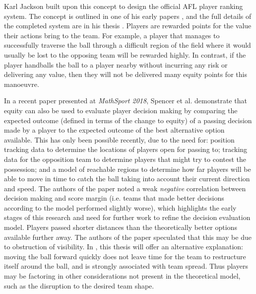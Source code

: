 Karl Jackson built upon this concept to design the official AFL player ranking system. The concept is outlined in one of his early papers \cite{Jackson2008}, and the full details of the completed system are in his thesis \cite{Jackson2016}. Players are rewarded points for the value their actions bring to the team. For example, a player that manages to successfully traverse the ball through a difficult region of the field where it would usually be lost to the opposing team will be rewarded highly. In contrast, if the player handballs the ball to a player nearby
without incurring any risk or delivering any value, then they will not be delivered many equity points for this manoeuvre.

In a recent paper presented at \textit{MathSport 2018}, Spencer et al. \cite{Spencer2018} demonstrate that equity can also be used to evaluate player decision making by comparing the expected outcome (defined in terms of the change to equity) of a passing decision made by a player to the expected outcome of the best alternative option available. This has only been possible recently, due to the need for: position tracking data to determine the locations of players open for passing to; tracking data for the opposition team to determine players that might try to contest the possession; and a model of reachable regions to determine how far players will be able to move in time to catch the ball taking into account their current direction and speed. The authors of the paper noted a weak \textit{negative} correlation between decision making and score margin (i.e. teams that made better decisions according to the model performed slightly worse), which highlights the early stages of this research and need for further work to refine the decision evaluation model. Players passed shorter distances than the theoretically better options available further away. The authors of the paper speculated that this may be due to obstruction of visibility. In , this thesis will offer an alternative explanation: moving the ball forward quickly does not leave time for the team to restructure itself around the ball, and is strongly associated with team spread. Thus players may be factoring in other considerations not present in the theoretical model, such as the disruption to the desired team shape.

